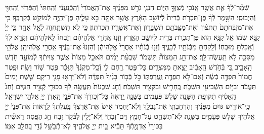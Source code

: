 \documentclass[twoside, openany, parskip=half, 11pt]{book}
\begin{document}
\begin{sometimes}
\begin{footnotesize}
\begin{multicols}{2}
שְֿׁמָ֨ר־לְֿֿךָ֔ אֵ֛ת אֲשֶׁ֥ר אָֽנֹכִ֖י מְֿצַוְּךָ֣ הַיּ֑וֹם הִנְנִ֧י גֹרֵ֣שׁ מִפָּנֶ֗יךָ אֶת־הָֽאֱמֹרִי֙ וְֿהַֽכְּֿנַֽעֲנִ֔י וְֿהַֽחִתִּי֙ וְֿהַפְּֿרִזִּ֔י וְֿהַֽחִוִּ֖י וְֿהַיְבוּסִֽי׃ הִשָּׁ֣מֶר לְֿךָ֗ פֶּן־תִּכְרֹ֤ת בְּֿרִית֙ לְֿיוֹשֵׁ֣ב הָאָ֔רֶץ אֲשֶׁ֥ר אַתָּ֖ה בָּ֣א עָלֶ֑יהָ פֶּן־יִֽהְיֶ֥ה לְֿמוֹקֵ֖שׁ בְּֿקִרְבֶּֽךָ׃ כִּ֤י אֶת־מִזְבְּֿחֹתָם֙ תִּתֹּצ֔וּן וְֿאֶת־מַצֵּֽבֹתָ֖ם תְּֿשַׁבֵּר֑וּן וְֿאֶת־אֲשֵׁרָ֖יו תִּכְרֹתֽוּן׃ כִּ֛י לֹ֥א תִֽשְׁתַּֽחֲוֶ֖ה לְֿאֵ֣ל אַחֵ֑ר כִּ֤י יְיָ֙ קַנָּ֣א שְֿׁמ֔וֹ אֵ֥ל קַנָּ֖א הֽוּא׃ פֶּן־תִּכְרֹ֥ת בְּֿרִ֖ית לְֿיוֹשֵׁ֣ב הָאָ֑רֶץ וְֿזָנ֣וּ אַֽחֲרֵ֣י אֱלֹֽהֵיהֶ֗ם וְֿזָבְֿחוּ֙ לֵאלֹ֣הֵיהֶ֔ם וְֿקָרָ֣א לְֿךָ֔ וְֿאָֽכַלְתָּ֖ מִזִּבְחֽוֹ׃ וְֿלָֽקַחְתָּ֥ מִבְּֿנֹתָ֖יו לְֿבָנֶ֑יךָ וְֿזָנ֣וּ בְֿנֹתָ֗יו אַֽחֲרֵי֙ אֱלֹ֣הֵיהֶ֔ן וְֿהִזְנוּ֙ אֶת־בָּנֶ֔יךָ אַֽחֲרֵ֖י אֱלֹֽהֵיהֶֽן׃ אֱלֹהֵ֥י מַסֵּכָ֖ה לֹ֥א תַֽעֲשֶׂה־לָּֽךְ׃  אֶת־חַ֣ג הַמַּצּוֹת֘ תִּשְׁמֹר֒ שִׁבְעַ֨ת יָמִ֜ים תֹּאכַ֤ל מַצּוֹת֙ אֲשֶׁ֣ר צִוִּיתִ֔ךָ לְֿמוֹעֵ֖ד חֹ֣דֶשׁ הָֽאָבִ֑יב כִּ֚י בְּֿחֹ֣דֶשׁ הָֽאָבִ֔יב יָצָ֖אתָ מִמִּצְרָֽיִם׃ כׇּל־פֶּ֥טֶר רֶ֖חֶם לִ֑י וְֿכָֽל־מִקְנְֿךָ֙ תִּזָּכָ֔ר פֶּ֖טֶר שׁ֥וֹר וָשֶֽׂה׃ וּפֶ֤טֶר חֲמוֹר֙ תִּפְדֶּ֣ה בְֿשֶׂ֔ה וְֿאִם־לֹ֥א תִפְדֶּ֖ה וַֽעֲרַפְתּ֑וֹ כֹּ֣ל בְּֿכ֤וֹר בָּנֶ֨יךָ֙ תִּפְדֶּ֔ה וְֿלֹא־יֵֽרָא֥וּ פָנַ֖י רֵיקָֽם׃ שֵׁ֤שֶׁת יָמִים֙ תַּֽעֲבֹ֔ד וּבַיּ֥וֹם הַשְּֿׁבִיעִ֖י תִּשְׁבֹּ֑ת בֶּֽחָרִ֥ישׁ וּבַקָּצִ֖יר תִּשְׁבֹּֽת׃ וְֿחַ֤ג שָֽׁבֻעֹת֙ תַּֽעֲשֶׂ֣ה לְֿךָ֔ בִּכּוּרֵ֖י קְֿצִ֣יר חִטִּ֑ים וְֿחַג֙ הָֽאָסִ֔יף תְּֿקוּפַ֖ת הַשָּׁנָֽה׃ שָׁל֥שׁ פְּֿעָמִ֖ים בַּשָּׁנָ֑ה יֵֽרָאֶה֙ כׇּל־זְֿכ֣וּרְֿךָ֔ אֶת־פְּֿֿנֵ֛י הָֽאָדֹ֥ן יְיָ֖ אֱלֹהֵ֥י יִשְׂרָאֵֽל׃ כִּֽי־אוֹרִ֤ישׁ גּוֹיִם֙ מִפָּנֶ֔יךָ וְֿהִרְחַבְתִּ֖י אֶת־גְּֿֿבֻלֶ֑ךָ וְֿלֹֽא־יַחְמֹ֥ד אִישׁ֙ אֶֽת־אַרְצְֿךָ֔ בַּֽעֲלֹֽתְֿךָ֗ לֵֽרָאוֹת֙ אֶת־פְּֿֿנֵי֙ יְיָ֣ אֱלֹהֶ֔יךָ שָׁל֥שׁ פְּֿעָמִ֖ים בַּשָּׁנָֽה׃ לֹֽא־תִשְׁחַ֥ט עַל־חָמֵ֖ץ דַּם־זִבְחִ֑י וְֿלֹֽא־יָלִ֣ין לַבֹּ֔קֶר זֶ֖בַח חַ֥ג הַפָּֽסַח׃ רֵאשִׁ֗ית בִּכּוּרֵי֙ אַדְמָ֣תְֿךָ֔ תָּבִ֕יא בֵּ֖ית יְיָ֣ אֱלֹהֶ֑יךָ לֹֽא־תְֿֿבַשֵּׁ֥ל גְּֿדִ֖י בַּֽחֲלֵ֥ב אִמּֽוֹ׃



\end{multicols}
\end{footnotesize}
\end{sometimes}
\end{document}
